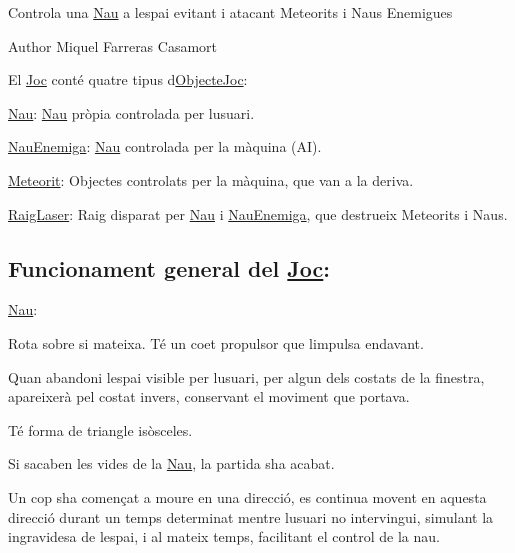 Controla una \hyperlink{class_nau}{Nau} a l\textquotesingle{}espai evitant i atacant Meteorits i Naus Enemigues \begin{DoxyAuthor}{Author}
Miquel Farreras Casamort
\end{DoxyAuthor}
El \hyperlink{class_joc}{Joc} conté quatre tipus d\textquotesingle{}\hyperlink{interface_objecte_joc}{Objecte\+Joc}\+:
\begin{DoxyItemize}
\item \hyperlink{class_nau}{Nau}\+: \hyperlink{class_nau}{Nau} pròpia controlada per l\textquotesingle{}usuari.
\item \hyperlink{class_nau_enemiga}{Nau\+Enemiga}\+: \hyperlink{class_nau}{Nau} controlada per la màquina (A\+I).
\item \hyperlink{class_meteorit}{Meteorit}\+: Objectes controlats per la màquina, que van a la deriva.
\item \hyperlink{class_raig_laser}{Raig\+Laser}\+: Raig disparat per \hyperlink{class_nau}{Nau} i \hyperlink{class_nau_enemiga}{Nau\+Enemiga}, que destrueix Meteorits i Naus.
\end{DoxyItemize}

\subsection*{Funcionament general del \hyperlink{class_joc}{Joc}\+: }

\hyperlink{class_nau}{Nau}\+:
\begin{DoxyItemize}
\item Rota sobre si mateixa. Té un coet propulsor que l\textquotesingle{}impulsa endavant.
\item Quan abandoni l\textquotesingle{}espai visible per l\textquotesingle{}usuari, per algun dels costats de la finestra, apareixerà pel costat invers, conservant el moviment que portava.
\item Té forma de triangle isòsceles.
\item Si s\textquotesingle{}acaben les vides de la \hyperlink{class_nau}{Nau}, la partida s\textquotesingle{}ha acabat.
\item Un cop s\textquotesingle{}ha començat a moure en una direcció, es continua movent en aquesta direcció durant un temps determinat mentre l\textquotesingle{}usuari no intervingui, simulant la ingravidesa de l\textquotesingle{}espai, i al mateix temps, facilitant el control de la nau.
\end{DoxyItemize}

